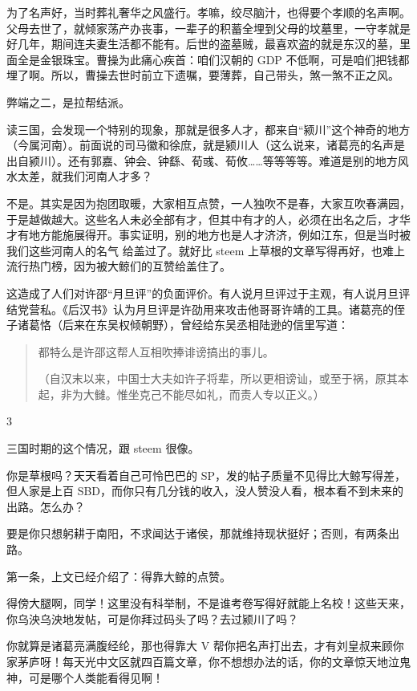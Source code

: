 \documentclass[]{ctexbook}
\begin{document}
为了名声好，当时葬礼奢华之风盛行。孝嘛，绞尽脑汁，也得要个孝顺的名声啊。父母去世了，就倾家荡产办丧事，一辈子的积蓄全埋到父母的坟墓里，一守孝就是好几年，期间连夫妻生活都不能有。后世的盗墓贼，最喜欢盗的就是东汉的墓，里面全是金银珠宝。曹操为此痛心疾首：咱们汉朝的 GDP 不低啊，可是咱们把钱都埋了啊。所以，曹操去世时前立下遗嘱，要薄葬，自己带头，煞一煞不正之风。

弊端之二，是拉帮结派。

读三国，会发现一个特别的现象，那就是很多人才，都来自``颍川''这个神奇的地方（今属河南）。前面说的司马徽和徐庶，就是颍川人（这么说来，诸葛亮的名声是出自颍川）。还有郭嘉、钟会、钟繇、荀彧、荀攸\ldots{}\ldots{}等等等等。难道是别的地方风水太差，就我们河南人才多？

不是。其实是因为抱团取暖，大家相互点赞，一人独吹不是春，大家互吹春满园，于是越做越大。这些名人未必全部有才，但其中有才的人，必须在出名之后，才华才有地方能施展得开。事实证明，别的地方也是人才济济，例如江东，但是当时被我们这些河南人的名气 给盖过了。就好比 steem 上草根的文章写得再好，也难上流行热门榜，因为被大鲸们的互赞给盖住了。

这造成了人们对许邵``月旦评''的负面评价。有人说月旦评过于主观，有人说月旦评结党营私。《后汉书》认为月旦评是许劭用来攻击他哥哥许靖的工具。诸葛亮的侄子诸葛恪（后来在东吴权倾朝野），曾经给东吴丞相陆逊的信里写道：

\begin{quote}
都特么是许邵这帮人互相吹捧诽谤搞出的事儿。

（自汉末以来，中国士大夫如许子将辈，所以更相谤讪，或至于祸，原其本起，非为大雠。惟坐克己不能尽如礼，而责人专以正义。）
\end{quote}

3

三国时期的这个情况，跟 steem 很像。

你是草根吗？天天看着自己可怜巴巴的 SP，发的帖子质量不见得比大鲸写得差，但人家是上百 SBD，而你只有几分钱的收入，没人赞没人看，根本看不到未来的出路。怎么办？

要是你只想躬耕于南阳，不求闻达于诸侯，那就维持现状挺好；否则，有两条出路。

第一条，上文已经介绍了：得靠大鲸的点赞。

得傍大腿啊，同学！这里没有科举制，不是谁考卷写得好就能上名校！这些天来，你乌泱乌泱地发帖，可是你拜过码头了吗？去过颍川了吗？

你就算是诸葛亮满腹经纶，那也得靠大 V 帮你把名声打出去，才有刘皇叔来顾你家茅庐呀！每天光中文区就四百篇文章，你不想想办法的话，你的文章惊天地泣鬼神，可是哪个人类能看得见啊！
\end{document}
